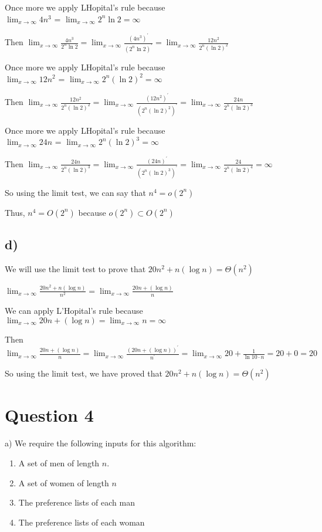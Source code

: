 \documentclass{article}
\begin{document}
Once more we apply LHopital's rule because \\
$\lim_{x \to \infty} 4n^3$ = $\lim_{x \to \infty} 2^n \ln 2 = \infty$

Then $\lim_{x \to \infty} \frac{4n^3}{2^n \ln 2} = \lim_{x \to \infty} \frac{(4n^3)^\prime}{(2^n \ln 2)^\prime} = \lim_{x \to \infty} \frac{12n^2}{2^n (\ln 2)^2}$

Once more we apply LHopital's rule because \\
$\lim_{x \to \infty} 12n^2$ = $\lim_{x \to \infty} 2^n (\ln 2)^2 = \infty$

Then $\lim_{x \to \infty} \frac{12n^2}{2^n (\ln 2)^2} = \lim_{x \to \infty} \frac{(12n^2)^\prime}{(2^n (\ln 2)^2)^\prime} = \lim_{x \to \infty} \frac{24n}{2^n (\ln 2)^3}$

Once more we apply LHopital's rule because \\
$\lim_{x \to \infty} 24n$ = $\lim_{x \to \infty} 2^n (\ln 2)^3 = \infty$

Then $\lim_{x \to \infty} \frac{24n}{2^n (\ln 2)^3} = \lim_{x \to \infty} \frac{(24n)^\prime}{(2^n (\ln 2)^3)^\prime} = \lim_{x \to \infty} \frac{24}{2^n (\ln 2)^4} = \infty$

So using the limit test, we can say that $n^4 = o(2^n)$

Thus, $n^4 = O(2^n)$ because $o(2^n) \subset O(2^n)$

\subsection*{d)}
We will use the limit test to prove that $20n^2+n (\log n) = \Theta(n^2)$

$\lim_{x \to \infty} \frac{20n^2+n(\log n)}{n^2} = \lim_{x \to \infty} \frac{20n+(\log n)}{n}$

We can apply L'Hopital's rule because
$\lim_{x \to \infty} 20n+(\log n) = \lim_{x \to \infty} n = \infty$

Then $\lim_{x \to \infty} \frac{20n+(\log n)}{n} = \lim_{x \to \infty} \frac{(20n+(\log n))^\prime}{n^\prime} = \lim_{x \to \infty} 20 + \frac{1}{\ln10 \cdot n} = 20+0 = 20$

So using the limit test, we have proved that $20n^2+n (\log n) = \Theta(n^2)$


\section*{Question 4}
a) We require the following inputs for this algorithm:
\begin{enumerate}
    \item A set of men of length $n$.
    \item A set of women of length $n$
    \item The preference lists of each man
    \item The preference lists of each woman
\end{enumerate}
\end{document}
